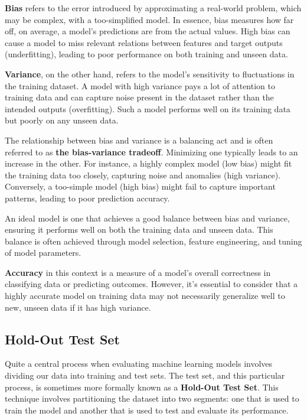 \documentclass[letterpaper,10pt]{article}
\begin{document}
\textbf{Bias} refers to the error introduced by approximating a real-world problem, which may be complex, with a too-simplified model. In essence, bias measures how far off, on average, a model's predictions are from the actual values. High bias can cause a model to miss relevant relations between features and target outputs (underfitting), leading to poor performance on both training and unseen data. \par

\textbf{Variance}, on the other hand, refers to the model's sensitivity to fluctuations in the training dataset. A model with high variance pays a lot of attention to training data and can capture noise present in the dataset rather than the intended outputs (overfitting). Such a model performs well on its training data but poorly on any unseen data. \par

The relationship between bias and variance is a balancing act and is often referred to as \textbf{the bias-variance tradeoff}. Minimizing one typically leads to an increase in the other. For instance, a highly complex model (low bias) might fit the training data too closely, capturing noise and anomalies (high variance). Conversely, a too-simple model (high bias) might fail to capture important patterns, leading to poor prediction accuracy. \par

An ideal model is one that achieves a good balance between bias and variance, ensuring it performs well on both the training data and unseen data. This balance is often achieved through model selection, feature engineering, and tuning of model parameters. \par

\textbf{Accuracy} in this context is a measure of a model's overall correctness in classifying data or predicting outcomes. However, it's essential to consider that a highly accurate model on training data may not necessarily generalize well to new, unseen data if it has high variance. \par


\subsection{Hold-Out Test Set}
Quite a central process when evaluating machine learning models involves dividing our data into training and test sets. The test set, and this particular process, is sometimes more formally known as a \textbf{Hold-Out Test Set}. This technique involves partitioning the dataset into two segments: one that is used to train the model and another that is used to test and evaluate its performance. \par
\end{document}
